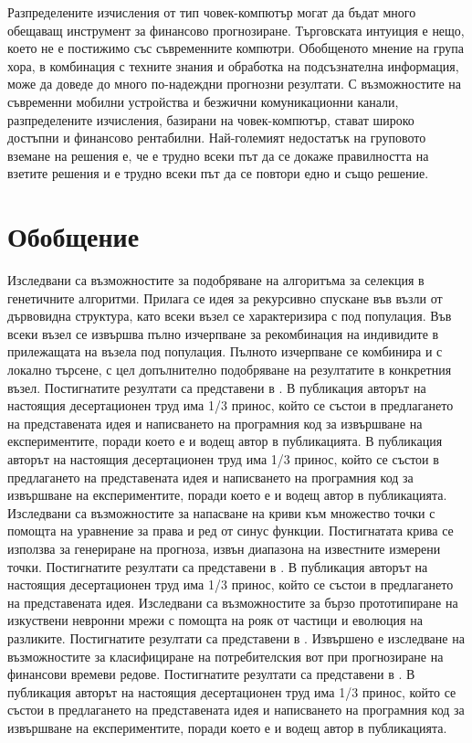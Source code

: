 Разпределените изчисления от тип човек-компютър могат да бъдат много обещаващ инструмент за финансово прогнозиране. Търговската интуиция е нещо, което не е постижимо със съвременните компютри. Обобщеното мнение на група хора, в комбинация с техните знания и обработка на подсъзнателна информация, може да доведе до много по-надеждни прогнозни резултати. С възможностите на съвременни мобилни устройства и безжични комуникационни канали, разпределените изчисления, базирани на човек-компютър, стават широко достъпни и финансово рентабилни. Най-големият недостатък на груповото вземане на решения е, че е трудно всеки път да се докаже правилността на взетите решения и е трудно всеки път да се повтори едно и също решение.

\section{Обобщение}

Изследвани са възможностите за подобряване на алгоритъма за селекция в генетичните алгоритми. Прилага се идея за рекурсивно спускане във възли от дървовидна структура, като всеки възел се характеризира с под популация. Във всеки възел се извършва пълно изчерпване за рекомбинация на индивидите в прилежащата на възела под популация. Пълното изчерпване се комбинира и с локално търсене, с цел допълнително подобряване на резултатите в конкретния възел. Постигнатите резултати са представени в \cite{Tomov-01,Tomov-02}. В публикация \cite{Tomov-01} авторът на настоящия десертационен труд има 1/3 принос, който се състои в предлагането на представената идея и написването на програмния код за извършване на експериментите, поради което е и водещ автор в публикацията. В публикация \cite{Tomov-02} авторът на настоящия десертационен труд има 1/3 принос, който се състои в предлагането на представената идея и написването на програмния код за извършване на експериментите, поради което е и водещ автор в публикацията. Изследвани са възможностите за напасване на криви към множество точки с помощта на уравнение за права и ред от синус функции. Постигнатата крива се използва за генериране на прогноза, извън диапазона на известните измерени точки. Постигнатите резултати са представени в \cite{Velichkova-01}. В публикация \cite{Velichkova-01} авторът на настоящия десертационен труд има 1/3 принос, който се състои в предлагането на представената идея. Изследвани са възможностите за бързо прототипиране на изкуствени невронни мрежи с помощта на рояк от частици и еволюция на разликите.  Постигнатите резултати са представени в \cite{Tomov-04}. Извършено е изследване на възможностите за класифициране на потребителския вот при прогнозиране на финансови времеви редове. Постигнатите резултати са представени в \cite{Tomov-03}. В публикация \cite{Tomov-03} авторът на настоящия десертационен труд има 1/3 принос, който се състои в предлагането на представената идея и написването на програмния код за извършване на експериментите, поради което е и водещ автор в публикацията.

